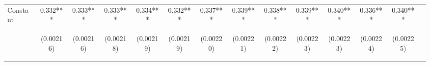 \begin{table}
\begin{center}
{\begin{tabular}{lccccccccccccc}
Constant  & 0.332*** & 0.333*** & 0.333*** & 0.334*** & 0.332*** & 0.337*** & 0.339*** & 0.338*** & 0.339*** & 0.340*** & 0.336*** & 0.340*** \\
 &  \begin{footnotesize}(0.00216)\end{footnotesize} & \begin{footnotesize}(0.00216)\end{footnotesize} & \begin{footnotesize}(0.00218)\end{footnotesize} & \begin{footnotesize}(0.00219)\end{footnotesize} & \begin{footnotesize}(0.00219)\end{footnotesize} & \begin{footnotesize}(0.00220)\end{footnotesize} & \begin{footnotesize}(0.00221)\end{footnotesize} & \begin{footnotesize}(0.00222)\end{footnotesize} & \begin{footnotesize}(0.00223)\end{footnotesize} & \begin{footnotesize}(0.00223)\end{footnotesize} & \begin{footnotesize}(0.00224)\end{footnotesize} & \begin{footnotesize}(0.00225)\end{footnotesize} \\

\end{tabular}}
\end{center}
\end{table}
